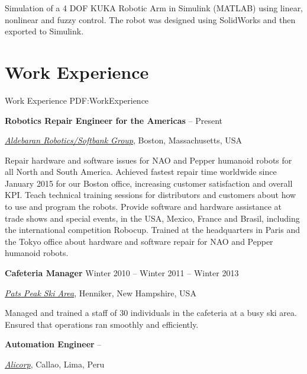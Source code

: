 \documentclass[letterpaper,MMMyyyy,nonstop]{simpleresumecv}
\begin{document}
\begin{body}
\GapNoBreak
\BulletItem
Simulation of a 4 DOF KUKA Robotic Arm in Simulink (MATLAB) using linear, nonlinear and fuzzy control. The robot was designed using SolidWorks and then exported to Simulink.
\GapNoBreak

%


\section
{Work Experience}
{Work Experience}
{PDF:WorkExperience}

\textbf{Robotics Repair Engineer for the Americas}
\hfill
{} --
Present 
\begin{detail}
\normalsize{ \href{https://www.aldebaran.com/en}
{\textit{Aldebaran Robotics/Softbank Group}},
Boston, Massachusetts, USA }
\end{detail}

\GapNoBreak
\BulletItem
Repair hardware and software issues for NAO and Pepper humanoid robots for all North and South America. 
\BulletItem
Achieved fastest repair time worldwide since January 2015 for our Boston office, increasing customer satisfaction and overall KPI.
\BulletItem
Teach technical training sessions for distributors and customers about how to use and program the robots.
\BulletItem
Provide software and hardware assistance at trade shows and special events, in the USA, Mexico, France and Brasil, including the international competition Robocup.
\BulletItem
Trained at the headquarters in Paris and the Tokyo office about hardware and software repair for NAO and Pepper humanoid robots.

\BigGap
\textbf{Cafeteria Manager}
\hfill
Winter 2010 --
Winter 2011 --
Winter 2013
\begin{detail}
\normalsize{ \href{http://www.patspeak.com/}
{\textit{Pats Peak Ski Area}},
Henniker, New Hampshire, USA }
\end{detail}

\GapNoBreak
\BulletItem
Managed and trained a staff of 30 individuals in the cafeteria at a busy ski area.
\BulletItem
Ensured that operations ran smoothly and efficiently.

\BigGap
\textbf{Automation Engineer}
\hfill
{} --
\begin{detail}
\normalsize{ \href{http://www.alicorp.com.pe/alicorp/index.html}
{\textit{Alicorp}},
Callao, Lima, Peru }
\end{detail}


\end{body}
\end{document}
